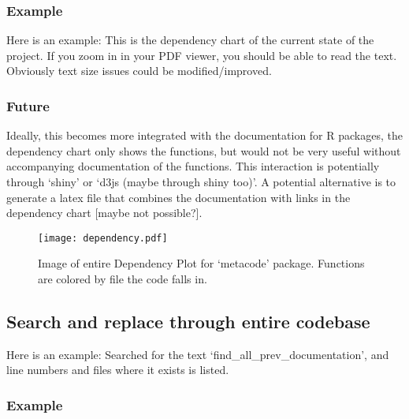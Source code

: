 \documentclass[11pt]{article}
\begin{document}
\subsubsection{Example}
Here is an example: This is the dependency chart of the current state of the project. If you zoom in in your PDF viewer, you should be able to read the text. Obviously text size issues could be modified/improved. 

\subsubsection{Future}
Ideally, this becomes more integrated with the documentation for R packages, the dependency chart only shows the functions, but would not be very useful without accompanying documentation of the functions. This interaction is potentially through `shiny' or `d3js (maybe through shiny too)'. A potential alternative is to generate a latex file that combines the documentation with links in the dependency chart [maybe not possible?]. 



\pagebreak
\begin{figure}[!h]
\texttt{[image: dependency.pdf]}
\caption{Image of entire Dependency Plot for `metacode' package. Functions are colored by file the code falls in.}
\end{figure}


\pagebreak
\subsection{Search and replace through entire codebase}
Here is an example: Searched for the text `find\_all\_prev\_documentation', and line numbers and files where it exists is listed. 
\subsubsection{Example}
\end{document}
